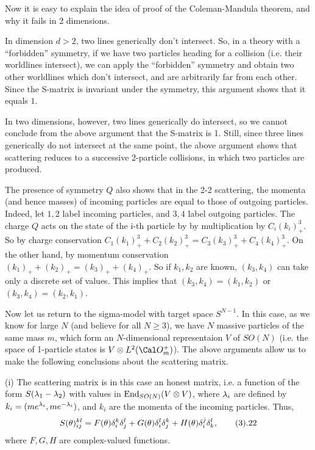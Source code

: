 Now it is easy to explain the idea of proof of the Coleman-Mandula theorem,
and why it fails in 2 dimensions. 

In dimension $d>2$, two lines 
generically don't intersect. So, in a theory with a ``forbidden'' symmetry,  
if we have two particles heading 
for a collision (i.e. their worldlines intersect), we can apply the 
``forbidden'' symmetry and obtain two other worldlines which don't intersect,
and are arbitrarily far from each other.
Since the S-matrix is invariant under the symmetry, this argument shows
that it equals $1$. 

In two dimensions, however, two lines generically do intersect, so we cannot 
conclude from the above argument that the S-matrix is 1. Still, since three
lines generically do not intersect at the same point, 
the above argument shows that scattering 
reduces to a successive 2-particle collisions, in which 
two particles are produced. 

The presence of symmetry $Q$ also shows that 
in the 2-2 scattering, the momenta (and hence masses) of incoming particles 
are equal to those of outgoing particles.
Indeed, let $1,2$ label incoming particles, and $3,4$ label outgoing 
particles. The charge $Q$ acts on the state of the i-th particle by 
by multiplication by $C_i(k_i)_+^3$. So by charge conservation
$C_1(k_1)_+^3+C_2(k_2)_+^3=C_3(k_3)_+^3+C_4(k_4)_+^3$.
On the other hand, by momentum conservation 
$(k_1)_++(k_2)_+=(k_3)_++(k_4)_+$. So if $k_1,k_2$ are known, 
$(k_3,k_4)$ can take only a discrete set of values. 
This implies that $(k_3,k_4)=(k_1,k_2)$ or $(k_3,k_4)=(k_2,k_1)$. 

Now let us return to the sigma-model with target space $S^{N-1}$.
In this case, as we know for large $N$ (and believe for all $N\ge 3$),  
we have $N$ massive particles of the same mass $m$, which form 
an $N$-dimensional representaion $V$ of $SO(N)$
(i.e. the space of 1-particle states is $V\o L^2(\O_m^+)$). 
The above arguments allow us to make the following conclusions about 
the scattering matrix.

(i) The scattering matrix is in this case an honest matrix, i.e. 
a function of the form $S(\lambda_1-\lambda_2)$ with values in $\text{End}_{SO(N)}(V\otimes V)$, 
where $\lambda_i$ are defined by $k_i=(me^{\lambda_i},me^{-\lambda_i})$, and 
$k_i$ are the momenta of the incoming particles.
Thus, 
$$
S(\theta)_{ij}^{kl}=F(\theta)\delta_i^k\delta_j^l+
G(\theta)\delta_i^l\delta_j^k+H(\theta)\delta_i^j\delta_k^l,\tag 3.22
$$
where $F,G,H$ are complex-valued functions. 

